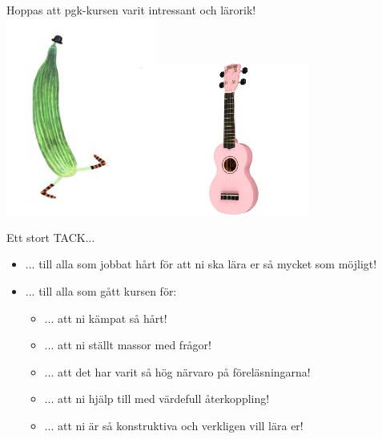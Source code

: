 \begin{Slide}{Hoppas att pgk-kursen varit intressant och lärorik!}
\pause\includegraphics[width=5cm]{../img/gurka.jpg}\includegraphics[width=5cm]{../img/ukulele.jpg}
\end{Slide}

\begin{Slide}{Ett stort TACK...}
\begin{itemize}
  \item
... till alla  som jobbat hårt för att ni ska lära er så mycket som möjligt!
\item ... till alla  som gått kursen för:
\begin{itemize}
\item ... att ni kämpat så hårt!
\item ... att ni ställt massor med frågor!
\item ... att det har varit så hög närvaro på föreläsningarna!
\item ... att ni hjälp till med värdefull återkoppling!
\item ... att ni är så konstruktiva och verkligen vill lära er!
\end{itemize}
\vspace{2em} \pause

\end{itemize}
\end{Slide}



\fi
